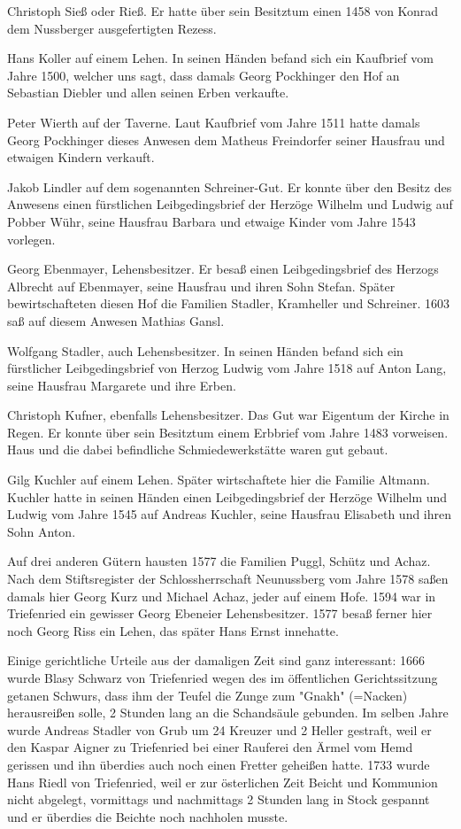 Christoph Sieß oder Rieß. Er hatte über sein Besitztum einen 1458 von Konrad dem
Nussberger ausgefertigten Rezess.

Hans Koller auf einem Lehen. In seinen Händen befand sich ein Kaufbrief vom
Jahre 1500, welcher uns sagt, dass damals Georg Pockhinger den Hof an Sebastian
Diebler und allen seinen Erben verkaufte.

Peter Wierth auf der Taverne. Laut Kaufbrief vom Jahre 1511 hatte damals Georg
Pockhinger dieses Anwesen dem Matheus Freindorfer seiner Hausfrau und etwaigen
Kindern verkauft.

Jakob Lindler auf dem sogenannten Schreiner-Gut. Er konnte über den Besitz des
Anwesens einen fürstlichen Leibgedingsbrief der Herzöge Wilhelm und Ludwig auf
Pobber Wühr, seine Hausfrau Barbara und etwaige Kinder vom Jahre 1543 vorlegen.

Georg Ebenmayer, Lehensbesitzer. Er besaß einen Leibgedingsbrief des Herzogs
Albrecht auf Ebenmayer, seine Hausfrau und ihren Sohn Stefan. Später
bewirtschafteten diesen Hof die Familien Stadler, Kramheller und Schreiner. 1603
saß auf diesem Anwesen Mathias Gansl.

Wolfgang Stadler, auch Lehensbesitzer. In seinen Händen befand sich ein
fürstlicher Leibgedingsbrief von Herzog Ludwig vom Jahre 1518 auf Anton Lang,
seine Hausfrau Margarete und ihre Erben.

Christoph Kufner, ebenfalls Lehensbesitzer. Das Gut war Eigentum der Kirche in
Regen. Er konnte über sein Besitztum einem Erbbrief vom Jahre 1483 vorweisen.
Haus und die dabei befindliche Schmiedewerkstätte waren gut gebaut.

Gilg Kuchler auf einem Lehen. Später wirtschaftete hier die Familie Altmann.
Kuchler hatte in seinen Händen einen Leibgedingsbrief der Herzöge Wilhelm und
Ludwig vom Jahre 1545 auf Andreas Kuchler, seine Hausfrau Elisabeth und ihren
Sohn Anton.



Auf drei anderen Gütern hausten 1577 die Familien Puggl, Schütz und Achaz. Nach
dem Stiftsregister der Schlossherrschaft Neunussberg vom Jahre 1578 saßen damals
hier Georg Kurz und Michael Achaz, jeder auf einem Hofe. 1594 war in Triefenried
ein gewisser Georg Ebeneier Lehensbesitzer. 1577 besaß ferner hier noch Georg
Riss ein Lehen, das später Hans Ernst innehatte.

Einige gerichtliche Urteile aus der damaligen Zeit sind ganz interessant: 1666
wurde Blasy Schwarz von Triefenried wegen des im öffentlichen Gerichtssitzung
getanen Schwurs, dass ihm der Teufel die Zunge zum "Gnakh" (=Nacken)
herausreißen solle, 2 Stunden lang an die Schandsäule gebunden. Im selben Jahre
wurde Andreas Stadler von Grub um 24 Kreuzer und 2 Heller gestraft, weil er den
Kaspar Aigner zu Triefenried bei einer Rauferei den Ärmel vom Hemd gerissen und
ihn überdies auch noch einen Fretter geheißen hatte. 1733 wurde Hans Riedl von
Triefenried, weil er zur österlichen Zeit Beicht und Kommunion nicht abgelegt,
vormittags und nachmittags 2 Stunden lang in Stock gespannt und er überdies die
Beichte noch nachholen musste.

